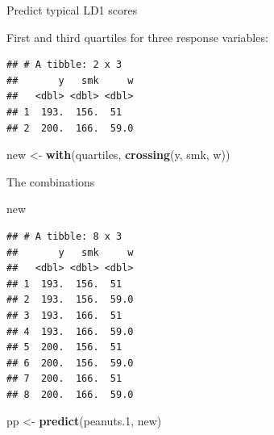 \documentclass[
  ignorenonframetext,
]{beamer}
\newenvironment{Shaded}{\begin{snugshade}}{\end{snugshade}}
\newcommand{\FloatTok}[1]{\textcolor[rgb]{0.00,0.00,0.81}{#1}}
\newcommand{\KeywordTok}[1]{\textcolor[rgb]{0.13,0.29,0.53}{\textbf{#1}}}
\newcommand{\NormalTok}[1]{#1}
\newcommand{\OperatorTok}[1]{\textcolor[rgb]{0.81,0.36,0.00}{\textbf{#1}}}
\newcommand{\StringTok}[1]{\textcolor[rgb]{0.31,0.60,0.02}{#1}}
\begin{document}
\begin{frame}[fragile]{Predict typical LD1 scores}
\protect\hypertarget{predict-typical-ld1-scores}{}

First and third quartiles for three response variables:

\begin{Shaded}
\end{Shaded}

\begin{verbatim}
## # A tibble: 2 x 3
##       y   smk     w
##   <dbl> <dbl> <dbl>
## 1  193.  156.  51  
## 2  200.  166.  59.0
\end{verbatim}

\begin{Shaded}
\begin{Highlighting}[]
\NormalTok{new <-}\StringTok{ }\KeywordTok{with}\NormalTok{(quartiles, }\KeywordTok{crossing}\NormalTok{(y, smk, w))}
\end{Highlighting}
\end{Shaded}

\end{frame}

\begin{frame}[fragile]{The combinations}
\protect\hypertarget{the-combinations}{}

\begin{Shaded}
\begin{Highlighting}[]
\NormalTok{new}
\end{Highlighting}
\end{Shaded}

\begin{verbatim}
## # A tibble: 8 x 3
##       y   smk     w
##   <dbl> <dbl> <dbl>
## 1  193.  156.  51  
## 2  193.  156.  59.0
## 3  193.  166.  51  
## 4  193.  166.  59.0
## 5  200.  156.  51  
## 6  200.  156.  59.0
## 7  200.  166.  51  
## 8  200.  166.  59.0
\end{verbatim}

\begin{Shaded}
\begin{Highlighting}[]
\NormalTok{pp <-}\StringTok{ }\KeywordTok{predict}\NormalTok{(peanuts}\FloatTok{.1}\NormalTok{, new)}
\end{Highlighting}
\end{Shaded}

\end{frame}
\end{document}
